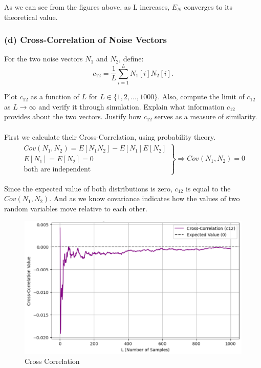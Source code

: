 \documentclass[hidelinks,12pt]{article}
\begin{document}
	As we can see from the figures above, as L increases, $E_N$ converges to its theoretical value.
	
	
	\subsubsection*{(d) Cross-Correlation of Noise Vectors}
	For the two noise vectors $N_1$ and $N_2$, define:
	\[ c_{12} = \frac{1}{L} \sum_{i=1}^L N_1[i] N_2[i]. \tag{7} \]
	
	 Plot $c_{12}$ as a function of $L$ for $L \in \{1, 2, \dots, 1000\}$. Also, compute the limit of $c_{12}$ as $L \to \infty$ and verify it through simulation. Explain what information $c_{12}$ provides about the two vectors. Justify how $c_{12}$ serves as a measure of similarity.
	\\ \\
	First we calculate their Cross-Correlation, using probability theory.
	\begin{equation*}
		\begin{split}
			\left.
			\begin{alignedat}{4}
				Cov(N_1, N_2) = E[N_1 N_2] - E[N_1] E[N_2]\\
				E[N_1] = E[N_2] = 0 \\
				\text{both are independent}
			\end{alignedat}
			\right \}
			\Rightarrow Cov(N_1, N_2) = 0
		\end{split}
	\end{equation*}
	
	 Since the expected value of both distributions is zero, $c_{12}$ is equal to the $Cov(N_1, N_2)$. And as we know covariance indicates how the values of two random variables move relative to each other.
	
	\begin{figure}[h!]
		\centering
		\includegraphics[scale=0.5]{figures/cross_correlation.png}
		\caption{Cross Correlation}
	\end{figure}
	
\end{document}

